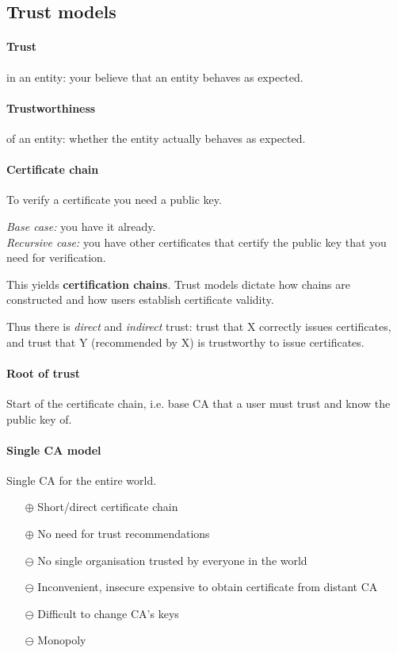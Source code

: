 \subsection{Trust models}

\paragraph{Trust} in an entity: your believe that an entity behaves as expected.

\paragraph{Trustworthiness} of an entity: whether the entity actually behaves as expected.

\paragraph{Certificate chain}\mbox{}

To verify a certificate you need a public key.

\textit{Base case:} you have it already. \\
\textit{Recursive case:} you have other certificates that certify the public key that you need for verification.

This yields \textbf{certification chains}. Trust models dictate how chains are constructed and how users establish certificate validity.

Thus there is \textit{direct} and \textit{indirect} trust: trust that X correctly issues certificates, and trust that Y (recommended by X) is trustworthy to issue certificates.

\paragraph{Root of trust} Start of the certificate chain, i.e. base CA that a user must trust and know the public key of.

\horizontaldivider

\paragraph{Single CA model} Single CA for the entire world.
\begin{itemize}
    \item[$\oplus$] Short/direct certificate chain
    \item[$\oplus$] No need for trust recommendations
    \item[$\ominus$] No single organisation trusted by everyone in the world
    \item[$\ominus$] Inconvenient, insecure expensive to obtain certificate from distant CA
    \item[$\ominus$] Difficult to change CA's keys
    \item[$\ominus$] Monopoly
\end{itemize}

